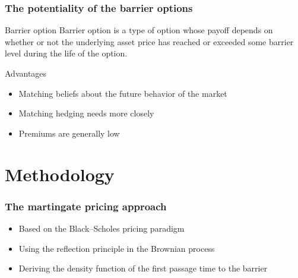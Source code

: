 \documentclass{beamer}
\begin{document}
\begin{frame}
\frametitle{The potentiality of the barrier options}
\begin{block}{Barrier option}
	Barrier option is a type of option whose payoff depends on whether or not the underlying asset price has reached or exceeded some barrier level during the life of the option. %
\end{block} \pause
{\color{red}Advantages}
\begin{itemize}
	\item Matching beliefs about the future behavior of the market \pause
	\item Matching hedging needs more closely \pause
	\item Premiums are generally low %
\end{itemize}
\end{frame}
\section{Methodology} %
\begin{frame}
\frametitle{The martingate pricing approach}
\begin{itemize}
	
	\item Based on the Black–Scholes pricing paradigm\pause \\[0.4cm]
	\item Using the reflection principle in the Brownian process\pause \\[0.4cm]%
	\item Deriving the density function of the first passage time to the barrier %
\end{itemize}
\end{frame}
\end{document}
